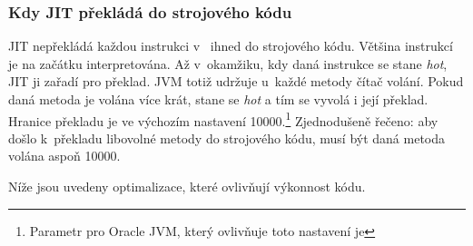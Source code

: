 \subsubsection{Kdy JIT překládá do strojového kódu\label{subsub:whenJIT}}
JIT nepřekládá každou instrukci v~\bytecode{} ihned do strojového kódu. Většina instrukcí je na začátku interpretována. Až v~okamžiku, kdy daná instrukce se stane \emph{hot}, JIT ji zařadí pro překlad. JVM totiž udržuje u~každé metody čítač volání. Pokud daná metoda je volána více krát, stane se \emph{hot} a tím se vyvolá i její překlad. Hranice překladu je ve výchozím nastavení 10000.\footnote{Parametr pro Oracle JVM, který ovlivňuje toto nastavení je } Zjednodušeně řečeno: aby došlo k~překladu libovolné metody do strojového kódu, musí být daná metoda volána aspoň 10000.

Níže jsou uvedeny optimalizace, které ovlivňují výkonnost kódu.

